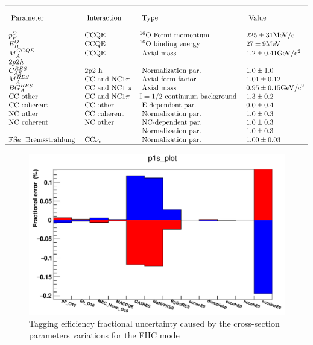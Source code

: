 \documentclass{article}
\begin{document}
$$
\begin{array}{llll}
\hline & & & \\
\text { Parameter } & \text { Interaction } & \text { Type } & \text { Value } \\
& & & \\
p_{F}^{O} & \mathrm{CCQE} & { }^{16} \mathrm{O} \text { Fermi momentum } & 225 \pm 31 \mathrm{MeV} / \mathrm{c} \\
E_{B}^{O} & \mathrm{CCQE} & { }^{16} \mathrm{O} \text { binding energy } & 27 \pm 9 \mathrm{MeV} \\
M_{A}^{C C Q E} & \mathrm{CCQE} & \text { Axial mass } & 1.2 \pm 0.41 \mathrm{GeV} / \mathrm{c}^{2} \\
2 p 2 h & & & \\
C_{A S}^{R E S} & 2 \mathrm{p} 2 \mathrm{~h} & \text { Normalization par. } & 1.0 \pm 1.0 \\
M_{A}^{R E S} & \mathrm{CC} \text { and } \mathrm{NC} 1 \pi & \text { Axial form factor } & 1.01 \pm 0.12 \\
B G_{A}^{R E S} & \mathrm{CC} \text { and NC1 } \pi & \text { Axial mass } & 0.95 \pm 0.15 \mathrm{GeV} / \mathrm{c}^{2} \\
\mathrm{CC} \text { other } & \mathrm{CC} \text { and } \mathrm{NC} 1 \pi & \mathrm{I}=1 / 2 \text { continuum background } & 1.3 \pm 0.2 \\
\mathrm{CC} \text { coherent } & \mathrm{CC} \text { other } & \text { E-dependent par. } & 0.0 \pm 0.4 \\
\mathrm{NC} \text { other } & \mathrm{CC} \text { coherent } & \text { Normalization par. } & 1.0 \pm 0.3 \\
\mathrm{NC} \text { coherent } & \mathrm{NC} \text { other } & \text { NC-dependent par. } & 1.0 \pm 0.3 \\
& & \text { Normalization par. } & 1.0 \pm 0.3 \\
\mathrm{FS} e^{-} \text {Bremsstrahlung } & \mathrm{CC} \nu_{e} & \text { Normalization par. } & 1.00 \pm 0.03 \\
\hline
\end{array}
\label{xsectable}
$$

\begin{figure}[h!]
    \includegraphics[scale=0.4]{xsec_uncertainty.png}
\caption{Tagging efficiency fractional uncertainty caused by the cross-section parameters variations for the FHC mode}
\label{fig:xsecuncertainty}
\end{figure}
\end{document}
